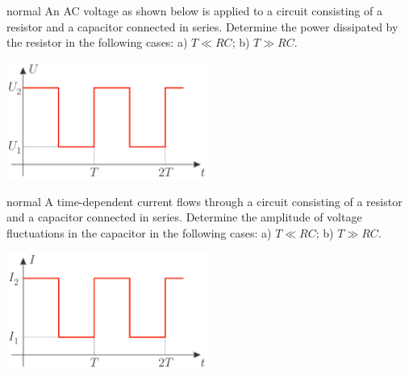 \hypertarget{P58}{}
\begin{solution}{normal} %
An AC voltage as shown below is applied to a circuit consisting of a resistor and a capacitor connected in series. Determine the power dissipated by the resistor in the following cases: a) $T\ll RC$; b) $T\gg RC$.
\begin{center}
    \includegraphics[width=0.5\textwidth]{S2 Figures/S2-58.png}
\end{center}
\end{solution}

\hypertarget{P59}{}
\begin{solution}{normal} %
A time-dependent current flows through a circuit consisting of a resistor and a capacitor connected in series. Determine the amplitude of voltage fluctuations in the capacitor in the following cases: a) $T\ll RC$; b) $T\gg RC$.
\begin{center}
    \includegraphics[width=0.5\textwidth]{S2 Figures/S2-59.png}
\end{center}
\end{solution}

